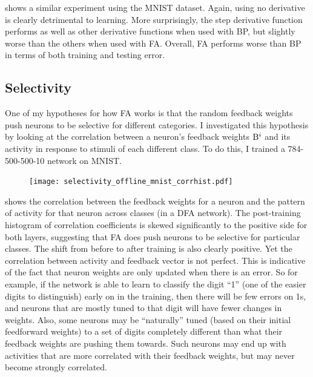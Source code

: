 shows a similar experiment using the MNIST dataset.
Again, using no derivative is clearly detrimental to learning.
More surprisingly, the step derivative function
performs as well as other derivative functions when used with BP,
but slightly worse than the others when used with FA.
Overall, FA performs worse than BP in terms of both training and testing error.


\subsection{Selectivity}

One of my hypotheses for how FA works
is that the random feedback weights
push neurons to be selective for different categories.
I investigated this hypothesis by looking at
the correlation between a neuron's feedback weights $\mathrm{B}^i$
and its activity in response to stimuli of each different class.
To do this, I trained a 784-500-500-10 network on MNIST.

\begin{figure}
  \centering
  \texttt{[image: selectivity\_offline\_mnist\_corrhist.pdf]}
\end{figure}

 shows the correlation between
the feedback weights for a neuron
and the pattern of activity for that neuron across classes
(in a DFA network).
The post-training histogram of correlation coefficients is skewed significantly
to the positive side for both layers,
suggesting that FA does push neurons to be selective for particular classes.
The shift from before to after training is also clearly positive.
Yet the correlation between activity and feedback vector is not perfect.
This is indicative of the fact that neuron weights are only updated
when there is an error.
So for example, if the network is able to learn to classify the digit ``1''
(one of the easier digits to distinguish)
early on in the training,
then there will be few errors on 1s,
and neurons that are mostly tuned to that digit
will have fewer changes in weights.
Also, some neurons may be ``naturally'' tuned (based on their initial feedforward weights)
to a set of digits completely different than what their feedback weights
are pushing them towards.
Such neurons may end up with activities that are more correlated
with their feedback weights,
but may never become strongly correlated.


